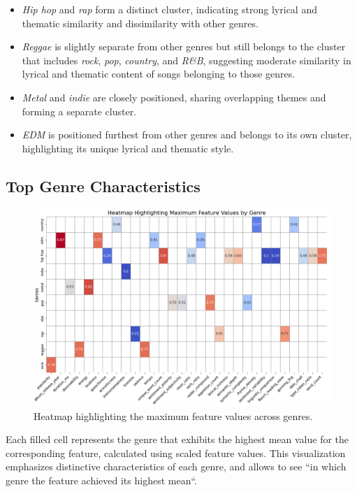 \begin{itemize}
  \item \textit{Hip hop} and \textit{rap} form a distinct cluster, indicating
    strong lyrical and thematic similarity and dissimilarity with other genres.
  \item \textit{Reggae} is slightly separate from other genres but still
    belongs to the cluster that includes \textit{rock}, \textit{pop},
    \textit{country}, and \textit{R\&B}, suggesting moderate similarity in
    lyrical and thematic content of songs belonging to those genres.
  \item \textit{Metal} and \textit{indie} are closely positioned, sharing
    overlapping themes and forming a  separate cluster.
  \item \textit{EDM} is positioned furthest from other genres and belongs to
    its own cluster, highlighting its unique lyrical and thematic style.
\end{itemize}

\subsection{Top Genre Characteristics}
\begin{center}
\begin{figure}[H]
  \centering
  \includegraphics[width=6in]{img/heatmap_max_feature_values_by_genre.png}
  \caption{Heatmap highlighting the maximum feature values across genres.}
  \label{Figure:dendrogram_spotify_features}
\end{figure}
\end{center}
Each filled cell represents the genre that exhibits the highest mean value for
the corresponding feature, calculated using scaled feature values. This
visualization emphasizes distinctive characteristics of each genre, and allows
to see ``in  which genre the feature achieved its highest mean``.

